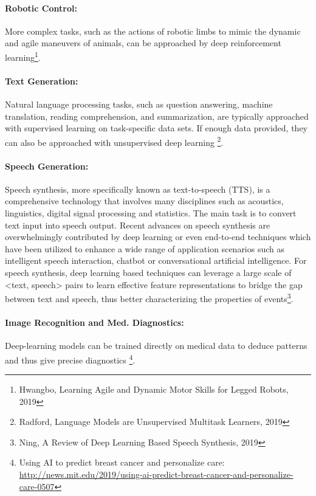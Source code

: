 \documentclass[main]{subfiles}
\begin{document}
\paragraph{Robotic Control:}
More complex tasks, such as the actions of robotic limbs to mimic the dynamic and agile maneuvers of animals, can be approached by deep reinforcement learning\footnote{Hwangbo, Learning Agile and Dynamic Motor Skills for Legged Robots, 2019}. 

\paragraph{Text Generation:}
Natural language processing tasks, such as question answering, machine translation, reading comprehension, and summarization, are typically approached with supervised learning on task-specific data sets. If enough data provided, they can also be approached with unsupervised deep learning \footnote{Radford, Language Models are Unsupervised Multitask Learners, 2019}.

\paragraph{Speech Generation:}
Speech synthesis, more specifically known as text-to-speech (TTS), is a comprehensive technology that involves many disciplines such as acoustics, linguistics, digital signal processing and statistics. The main task is to convert text input into speech output.  Recent advances on speech synthesis are overwhelmingly contributed by deep learning or even end-to-end techniques which have been utilized to enhance a wide range of application scenarios such as intelligent speech interaction, chatbot or conversational artificial intelligence. For speech synthesis, deep learning based techniques can leverage a large scale of <text, speech> pairs to learn effective feature representations to bridge the gap between text and speech, thus better characterizing the properties of events\footnote{Ning, A Review of Deep Learning Based Speech Synthesis, 2019}.

\paragraph{Image Recognition and Med. Diagnostics:}
Deep-learning models can be trained directly on medical data to deduce patterns and thus give precise diagnostics \footnote{Using AI to predict breast cancer and personalize care: \url{http://news.mit.edu/2019/using-ai-predict-breast-cancer-and-personalize-care-0507}}.
\end{document}
